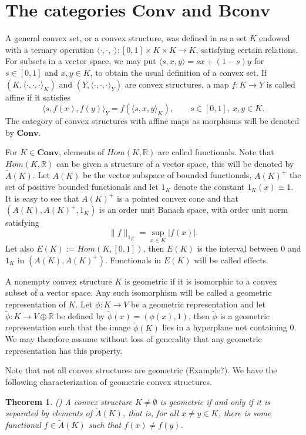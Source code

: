 \documentclass[12pt]{article}
\newtheorem{thm}{Theorem}
\newcommand{\<}{\langle}
\def\>{\rangle}
\newcommand{\ct}[1]{\mathbf{#1}}
\begin{document}
 

\section{The categories $\ct{Conv}$ and $\ct{Bconv}$}


A general convex set, or a convex structure, was defined in \cite{gudder} as a set $K$ endowed with a ternary operation $\<\cdot,\cdot,\cdot\>: [0,1]\times K\times K\to K$,
 satisfying certain relations. For subsets in a vector space, we may put $\<s,x,y\>=sx+(1-s)y$ for $s\in [0,1]$ and $x,y\in K$, to obtain the usual definition of a convex set.  If $(K,\<\cdot,\cdot,\cdot\>_K)$ and $(Y,\<\cdot,\cdot,\cdot\>_Y)$ are convex structures, a map $f:K\to Y$ is called affine if it satisfies
\[
\<s,f(x),f(y)\>_Y=f(\<s,x,y\>_K),\qquad s\in [0,1],\ x,y\in K.
\]
The category of convex structures with affine maps as morphisms will be denoted by $\ct{Conv}$. 

For $K\in \ct{Conv}$, elements of $Hom(K,\mathbb R)$ are called functionals. Note that $Hom(K,\mathbb R)$ can be given a structure of a vector space, this will be denoted by $\widetilde A(K)$.  Let $A(K)$ be the vector subspace of bounded functionals, $A(K)^+$ the set of positive bounded functionals and let $1_K$ denote the constant $1_K(x)\equiv 1$. It is easy to see that $A(K)^+$ is a pointed convex cone and that $(A(K),A(K)^+,1_K)$ is an  order unit Banach space, with order unit norm satisfying
\[
\|f\|_{1_K}=\sup_{x\in K} |f(x)|.
\]
Let also $E(K):=Hom(K,[0,1])$, then $E(K)$ is the interval between 0 and $1_K$ in $(A(K),A(K)^+)$. Functionals in  $E(K)$ will be called effects.





A nonempty convex structure $K$ is geometric if it is isomorphic to a convex subset of a vector space. Any such isomorphism will be called a geometric representation of $K$.
Let $\phi:K\to V$ be a geometric representation and let $\tilde \phi:K\to V\oplus \mathbb R$ be defined by $\tilde \phi(x)=(\phi(x),1)$, then $\tilde \phi$ is a geometric 
representation  such that the image $\tilde \phi(K)$ lies in a hyperplane not containing 0. We may therefore assume without loss of generality  that any geometric representation has this property.

 Note that not all convex structures are geometric (Example?). We have the following characterization of geometric convex structures.
\begin{thm}(\cite[Thm. 2.2]{gudder}) \label{thm:gudder} A convex structure $K\neq \emptyset$ is geometric if and only if it is separated by elements of $\widetilde A(K)$, 
that is, for all $x\ne y\in K$, there is some functional $f\in \widetilde A(K)$ such that $f(x)\ne f(y)$. 
\end{thm}
\end{document}
